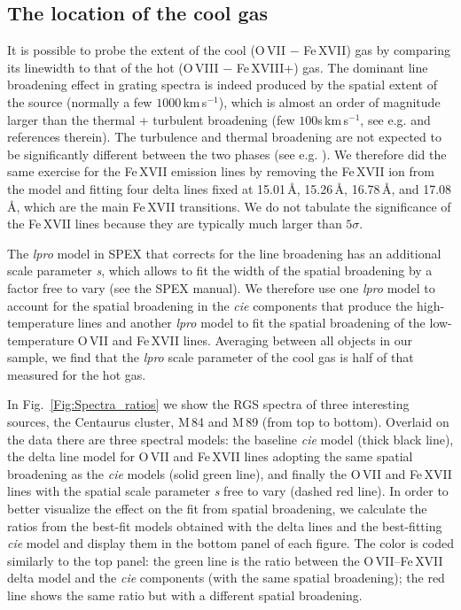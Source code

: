 \documentclass[useAMS,usenatbib]{mn2e}
\begin{document}
\subsection{The location of the cool gas}
\label{sec:gas_location}

It is possible to probe the extent of the cool ({O\,{\small VII}} $-$ Fe\,{\small XVII}) 
gas by comparing its linewidth to that of the hot ({O\,{\small VIII}} $-$ Fe\,{\small XVIII+})
gas. The dominant line broadening effect in grating spectra is indeed produced by the spatial
extent of the source (normally a few $1000$\,km\,s$^{-1}$), which is almost an order of magnitude
larger than the thermal + turbulent broadening (few $100$s\,km\,s$^{-1}$, see e.g. 
\citealt{Pinto2015} and references therein).
The turbulence and thermal broadening are not expected to be 
significantly different between the two phases (see e.g. \citealt{Pinto2015}).
We therefore did the same exercise for the Fe\,{\small XVII} emission lines by
removing the Fe\,{\small XVII} ion from the model and fitting four delta lines fixed at
15.01\,{\AA}, 15.26\,{\AA}, 16.78\,{\AA}, and 17.08\,{\AA},
which are the main Fe\,{\small XVII} transitions.
We do not tabulate the significance of the Fe\,{\small XVII} lines because
they are typically much larger than $5\sigma$.

The \textit{lpro} model in SPEX that corrects for the line broadening 
has an additional scale parameter \textit{s}, which allows to fit the
width of the spatial broadening by a factor free to vary (see the SPEX manual).
We therefore use one \textit{lpro} model to account for the spatial broadening
in the \textit{cie} components that produce the high-temperature lines and 
another \textit{lpro} model to fit the spatial broadening
of the low-temperature {O\,{\small VII}} and Fe\,{\small XVII} lines.
Averaging between all objects in our sample, we find that 
the \textit{lpro} scale parameter of the cool gas
is half of that measured for the hot gas.

In Fig.~\ref{Fig:Spectra_ratios} we show the RGS spectra of three interesting sources,
the Centaurus cluster, M\,84 and M\,89 (from top to bottom). 
Overlaid on the data there are three spectral models:
the baseline \textit{cie} model (thick black line), the delta line model 
for {O\,{\small VII}} and Fe\,{\small XVII} lines adopting the same spatial
broadening as the \textit{cie} models (solid green line),
and finally the {O\,{\small VII}} and Fe\,{\small XVII} lines with 
the spatial scale parameter \textit{s} free to vary (dashed red line).
In order to better visualize the effect on the fit from spatial broadening,
we calculate the ratios from the best-fit models obtained with the delta lines
and the best-fitting \textit{cie} model and display them in the bottom panel
of each figure. The color is coded similarly to the top panel: 
the green line is the ratio between the {O\,{\small VII}}--Fe\,{\small XVII} delta
model and the \textit{cie} components (with the same spatial broadening); 
the red line shows the same ratio but with a different spatial broadening.
\end{document}
